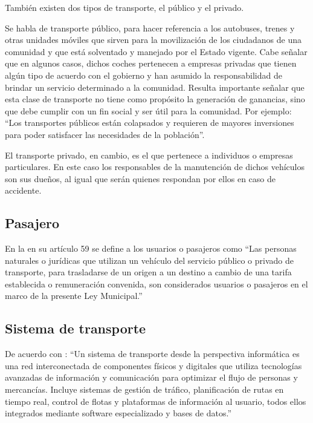 		También existen dos tipos de transporte, el público y el privado.
		
		Se habla de transporte público, para hacer referencia a los autobuses, trenes y otras unidades móviles que sirven para la movilización de los ciudadanos de una comunidad y que está solventado y manejado por el Estado vigente. Cabe señalar que en algunos casos, dichos coches pertenecen a empresas privadas que tienen algún tipo de acuerdo con el gobierno y han asumido la responsabilidad de brindar un servicio determinado a la comunidad. Resulta importante señalar que esta clase de transporte no tiene como propósito la generación de ganancias, sino que debe cumplir con un fin social y ser útil para la comunidad. Por ejemplo: “Los transportes públicos están colapsados y requieren de mayores inversiones para
		poder satisfacer las necesidades de la población”.
		
		El transporte privado, en cambio, es el que pertenece a individuos o empresas particulares. En este caso los responsables de la manutención de dichos vehículos son sus dueños, al igual que serán quienes respondan por ellos en caso de
		accidente.
	\subsection{Pasajero}
		En la \textcite{ley_municipal2012transporte} en su artículo 59 se define a los usuarios o pasajeros como ``Las personas naturales o jurídicas que utilizan un vehículo del servicio público o privado de transporte, para trasladarse de un origen a un destino a cambio de una tarifa establecida o remuneración convenida, son considerados usuarios o pasajeros en el marco de la presente Ley Municipal.''
	
	\subsection{Sistema de transporte}
		De acuerdo con \textcite{garcía2016gestión}: ``Un sistema de transporte desde la perspectiva informática es una red interconectada de componentes físicos y digitales que utiliza tecnologías avanzadas de información y comunicación para optimizar el flujo de personas y mercancías. Incluye sistemas de gestión de tráfico, planificación de rutas en tiempo real, control de flotas y plataformas de información al usuario, todos ellos integrados mediante software especializado y bases de datos.''
